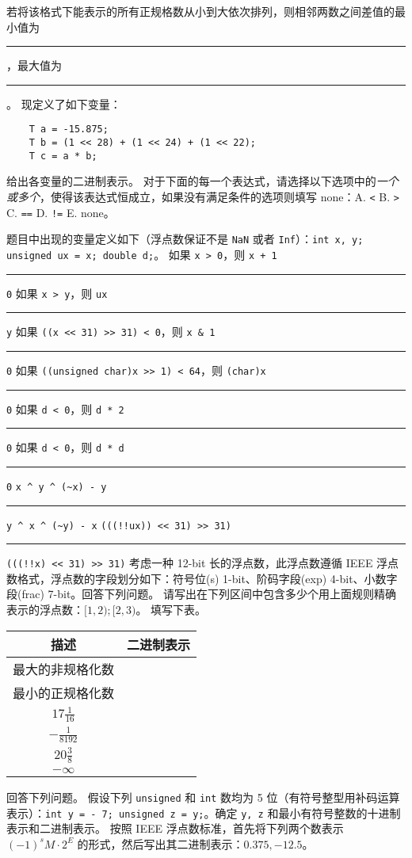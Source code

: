 \begin{problems}
			\qn 若将该格式下能表示的所有正规格数从小到大依次排列，则相邻两数之间差值的最小值为 \rule{2.5cm}{0.25mm}，最大值为 \rule{2.5cm}{0.25mm}。
			\qn 现定义了如下变量：
			\begin{verbatim}
    T a = -15.875;
    T b = (1 << 28) + (1 << 24) + (1 << 22);
    T c = a * b;
			\end{verbatim}
			给出各变量的二进制表示。
		 对于下面的每一个表达式，请选择以下选项中的\emph{一个或多个}，使得该表达式恒成立，如果没有满足条件的选项则填写 none：A. \quad \texttt{<} \quad B. \texttt{>} \quad C. \texttt{==} \quad D. \texttt{!=} \quad E. none。
		
		题目中出现的变量定义如下（浮点数保证不是 \texttt{NaN} 或者 \texttt{Inf}）：\texttt{int x, y; unsigned ux = x; double d;}。
		\qn 如果 \texttt{x > 0}，则 \texttt{x + 1} \rule{2.5cm}{0.25mm} \texttt{0}
		\qn 如果 \texttt{x > y}，则 \texttt{ux} \rule{2.5cm}{0.25mm} \texttt{y}
		\qn 如果 \verb|((x << 31) >> 31) < 0|，则 \verb|x & 1| \rule{2.5cm}{0.25mm} \texttt{0}
		\qn 如果 \verb|((unsigned char)x >> 1) < 64|，则 \texttt{(char)x} \rule{2.5cm}{0.25mm} \texttt{0}
		\qn 如果 \texttt{d < 0}，则 \texttt{d * 2} \rule{2.5cm}{0.25mm} \texttt{0}
		\qn 如果 \texttt{d < 0}，则 \texttt{d * d} \rule{2.5cm}{0.25mm} \texttt{0}
		\qn \verb|x ^ y ^ (~x) - y| \rule{2.5cm}{0.25mm} \verb|y ^ x ^ (~y) - x|
		\qn \verb|(((!!ux)) << 31) >> 31)| \rule{2.5cm}{0.25mm} \verb|(((!!x) << 31) >> 31)|
		 考虑一种 12-bit 长的浮点数，此浮点数遵循 IEEE 浮点数格式，浮点数的字段划分如下：符号位(s) 1-bit、阶码字段(exp) 4-bit、小数字段(frac) 7-bit。回答下列问题。
			\qn 请写出在下列区间中包含多少个用上面规则精确表示的浮点数：$[1, 2); [2, 3)$。
			\qn 填写下表。
			\begin{table}[H]
				\centering
				\begin{tabular}{|c|c|}
					\hline
					描述 & 二进制表示 \\ \hline
					最大的非规格化数 & {\qquad \qquad \qquad \qquad} \\ \hline
					最小的正规格化数 & {\qquad \qquad \qquad \qquad} \\ \hline
					$17 \frac{1}{16}$ & {\qquad \qquad \qquad \qquad} \\ \hline
					$-\frac{1}{8192}$ & {\qquad \qquad \qquad \qquad} \\ \hline
					$20 \frac{3}{8}$ & {\qquad \qquad \qquad \qquad} \\ \hline
					$-\infty$ & {\qquad \qquad \qquad \qquad} \\ \hline
				\end{tabular}
			\end{table}
		 回答下列问题。
			\qn 假设下列 \texttt{unsigned} 和 \texttt{int} 数均为 5 位（有符号整型用补码运算表示）：\texttt{int y = - 7; unsigned z = y;}。确定 \texttt{y, z} 和最小有符号整数的十进制表示和二进制表示。
			\qn 按照 IEEE 浮点数标准，首先将下列两个数表示 $(-1)^sM \cdot 2^E$ 的形式，然后写出其二进制表示：$0.375, -12.5$。
	\end{problems}
